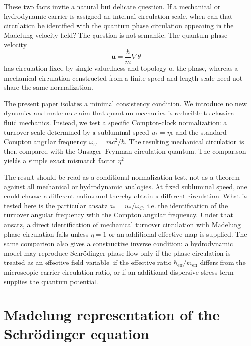 \documentclass[11pt,a4paper]{article}
\newcommand{\omegaC}{\omega_{C}}
\newcommand{\uStar}{u_{*}}
\newcommand{\aStar}{a_{*}}
\newcommand{\hbareff}{\hbar_{\mathrm{eff}}}
\newcommand{\meff}{m_{\mathrm{eff}}}
\begin{document}
These two facts invite a natural but delicate question. If a mechanical or hydrodynamic carrier is assigned an internal circulation scale, when can that circulation be identified with the quantum phase circulation appearing in the Madelung velocity field? The question is not semantic. The quantum phase velocity
\begin{equation}
    \mathbf{u}=\frac{\hbar}{m}\nabla\theta
\end{equation}
has circulation fixed by single-valuedness and topology of the phase, whereas a mechanical circulation constructed from a finite speed and length scale need not share the same normalization.

The present paper isolates a minimal consistency condition. We introduce no new dynamics and make no claim that quantum mechanics is reducible to classical fluid mechanics. Instead, we test a specific Compton-clock normalization: a turnover scale determined by a subluminal speed $\uStar=\eta c$ and the standard Compton angular frequency $\omegaC=mc^2/\hbar$. The resulting mechanical circulation is then compared with the Onsager--Feynman circulation quantum. The comparison yields a simple exact mismatch factor $\eta^2$.

The result should be read as a conditional normalization test, not as a theorem against all mechanical or hydrodynamic analogies. At fixed subluminal speed, one could choose a different radius and thereby obtain a different circulation. What is tested here is the particular ansatz $\aStar=\uStar/\omegaC$, i.e. the identification of the turnover angular frequency with the Compton angular frequency. Under that ansatz, a direct identification of mechanical turnover circulation with Madelung phase circulation fails unless $\eta=1$ or an additional effective map is supplied. The same comparison also gives a constructive inverse condition: a hydrodynamic model may reproduce Schr\"odinger phase flow only if the phase circulation is treated as an effective field variable, if the effective ratio $\hbareff/\meff$ differs from the microscopic carrier circulation ratio, or if an additional dispersive stress term supplies the quantum potential.

\section{Madelung representation of the Schr\"odinger equation}
\end{document}
